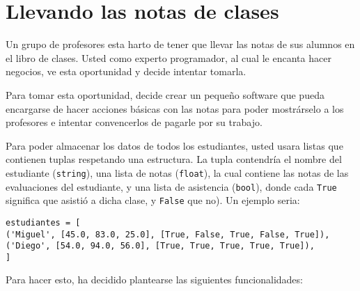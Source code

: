 \section{Llevando las notas de clases}


Un grupo de profesores esta harto de tener que llevar las notas de sus alumnos en el libro de clases. Usted como experto programador, al cual le encanta hacer negocios, ve esta oportunidad y decide intentar tomarla.

Para tomar esta oportunidad, decide crear un pequeño software que pueda encargarse de hacer acciones básicas con las notas para poder mostrárselo a los profesores e intentar convencerlos de pagarle por su trabajo.

Para poder almacenar los datos de todos los estudiantes, usted usara listas que contienen tuplas respetando una estructura. La tupla contendría el nombre del estudiante (\texttt{string}), una lista de notas (\texttt{float}), la cual contiene las notas de las evaluaciones del estudiante, y una lista de asistencia (\texttt{bool}), donde cada \texttt{True} significa que asistió a dicha clase, y \texttt{False} que no). Un ejemplo seria:

\begin{lstlisting}[style=consola]
estudiantes = [
('Miguel', [45.0, 83.0, 25.0], [True, False, True, False, True]), 
('Diego', [54.0, 94.0, 56.0], [True, True, True, True, True]), 
]
\end{lstlisting}

Para hacer esto, ha decidido plantearse las siguientes funcionalidades:


